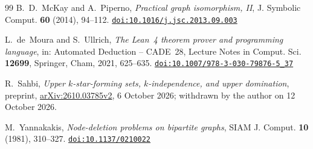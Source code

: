 \documentclass[11pt]{amsart}
\theoremstyle{definition}
\theoremstyle{remark}
\newcommand{\doi}[1]{\href{https://doi.org/#1}{\nolinkurl{doi:#1}}}
\begin{document}
\begin{thebibliography}{99}
B.~D.~McKay and A.~Piperno, \emph{Practical graph isomorphism, II}, J. Symbolic Comput. \textbf{60} (2014), 94--112. \doi{10.1016/j.jsc.2013.09.003}

L.~de~Moura and S.~Ullrich, \emph{The Lean~4 theorem prover and programming language}, in: Automated Deduction -- CADE~28, Lecture Notes in Comput. Sci. \textbf{12699}, Springer, Cham, 2021, 625--635. \doi{10.1007/978-3-030-79876-5_37}

R.~Sahbi, \emph{Upper $k$-star-forming sets, $k$-independence, and upper domination}, preprint, \href{https://arxiv.org/abs/2610.03785v2}{arXiv:2610.03785v2}, 6 October 2026; withdrawn by the author on 12 October 2026.

M.~Yannakakis, \emph{Node-deletion problems on bipartite graphs}, SIAM J. Comput. \textbf{10} (1981), 310--327. \doi{10.1137/0210022}

\end{thebibliography}
\end{document}
